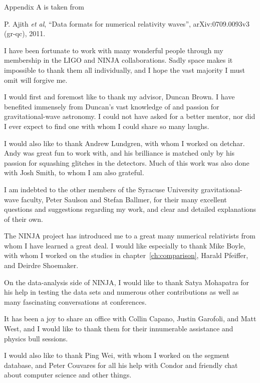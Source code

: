 \documentclass[12pt,notitlepage]{report}
\begin{document}
\vspace*{0.5cm}

\noindent Appendix A is taken from

\vspace*{0.25cm}

\noindent P. Ajith {\it et al}, ``Data formats for numerical
relativity waves'', arXiv:0709.0093v3 (gr-qc), 2011.
\fi



I have been fortunate to work with many wonderful people through my
membership in the LIGO and NINJA collaborations.  Sadly space makes it
impossible to thank them all individually, and I hope the vast
majority I must omit will forgive me.

I would first and foremost like to thank my advisor, Duncan Brown.  I
have benefited immensely from Duncan's vast knowledge of and passion
for gravitational-wave astronomy.  I could not have asked for a better
mentor, nor did I ever expect to find one with whom I could share so
many laughs.

I would also like to thank Andrew Lundgren, with whom I worked on
detchar.  Andy was great fun to work with, and his brilliance is
matched only by his passion for squashing glitches in the detectors.
Much of this work was also done with Josh Smith, to whom I am also
grateful.

I am indebted to the other members of the Syracuse University
gravitational-wave faculty, Peter Saulson and Stefan Ballmer, for their
many excellent questions and suggestions regarding my work, and clear
and detailed explanations of their own.

The NINJA project has introduced me to a great many numerical
relativists from whom I have learned a great deal.  I would like
especially to thank Mike Boyle, with whom I worked on the studies in
chapter~\ref{ch:comparison}, Harald Pfeiffer, and Deirdre Shoemaker.

On the data-analysis side of NINJA, I would like to thank Satya
Mohapatra for his help in testing the data sets and numerous other
contributions as well as many fascinating conversations at
conferences.

It has been a joy to share an office with Collin Capano, Justin
Garofoli, and Matt West, and I would like to thank them for their
innumerable assistance and physics bull sessions.

I would also like to thank Ping Wei, with whom I worked on the segment
database, and Peter Couvares for all his help with Condor and friendly
chat about computer science and other things.
\end{document}
